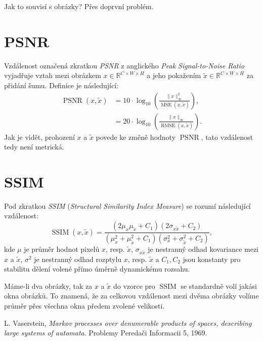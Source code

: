 \documentclass[czech]{article}
\begin{document}
Jak to souvisí s obrázky?
Přes doprvní problém.

\section{PSNR}

Vzdálenost označená zkratkou \emph{PSNR} z anglického \emph{Peak Signal-to-Noise Ratio}
vyjadřuje vztah mezi obrázkem $x \in \mathbb{R}^{C \times W \times H}$
a jeho pokažením $\tilde{x} \in \mathbb{R}^{C \times W \times H}$ za přidání šumu.
Definice je následující:
\begin{align}
    \operatorname{PSNR}(x, \tilde{x}) &= 10 \cdot \operatorname{log}_{10} \left( \frac{\|x\|_{\infty}^2}{\operatorname{MSE}(x, \tilde{x})} \right), \\
    &= 20 \cdot \operatorname{log}_{10} \left( \frac{\|x\|_{\infty}}{\operatorname{RMSE}(x, \tilde{x})} \right).
\end{align}
Jak je vidět, prohození $x$ a $\tilde{x}$ povede ke změně hodnoty $\operatorname{PSNR}$, tato vzdálenost tedy není metrická.

\section{SSIM}

Pod zkratkou \emph{SSIM} (\emph{Structural Similarity Index Measure})
se rozumí následující vzdálenost:
\begin{equation}
    \operatorname{SSIM}(x, \tilde{x}) = \frac{(2 \mu_x \mu_{\tilde{x}} + C_1)(2 \sigma_{x \tilde{x}} + C_2)}{(\mu_x^2 + \mu_{\tilde{x}}^2 + C_1)(\sigma_x^2 + \sigma_{\tilde{x}}^2 + C_2)},
\end{equation}
kde $\mu$ je průměr hodnot pixelů $x$, resp. $\tilde{x}$,
$\sigma_{x \tilde{x}}$ je nestranný odhad kovariance mezi $x$ a $\tilde{x}$,
$\sigma^2$ je nestranný odhad rozptylu $x$, resp. $\tilde{x}$
a $C_1, C_2$ jsou konstanty pro stabilitu dělení volené přímo úměrně dynamickému rozsahu.

Máme-li dva obrázky, tak za $x$ a $\tilde{x}$ do vzorce pro $\operatorname{SSIM}$ se standardně volí jakási okna obrázků.
To znamená, že za celkovou vzdálenost mezi dvěma obrázky volíme průměr přes všechna okna předem zvolené velikosti.


\begin{thebibliography}{1}

 L. Vaserstein,
\emph{Markov processes over denumerable products of spaces, describing large systems of automata}.
Problemy Peredači Informacii 5, 1969.

\end{thebibliography}
\end{document}
